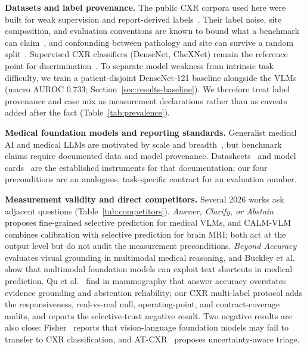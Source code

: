 \textbf{Datasets and label provenance.} The public CXR corpora used here were built for weak supervision and report-derived labels~\citep{wang2017chestxray8,bustos2020padchest,irvin2019chexpert,johnson2019mimic,chambon2024chexpertplus}. Their label noise, site composition, and evaluation conventions are known to bound what a benchmark can claim~\citep{rafferty2026limitations}, and confounding between pathology and site can survive a random split~\citep{zech2018confounding}. Supervised CXR classifiers (DenseNet, CheXNet) remain the reference point for discrimination~\citep{rajpurkar2017chexnet,huang2017densely}. To separate model weakness from intrinsic task difficulty, we train a patient-disjoint DenseNet-121 baseline alongside the VLMs (macro AUROC 0.733; Section~\ref{sec:results-baseline}). We therefore treat label provenance and case mix as measurement declarations rather than as caveats added after the fact (Table~\ref{tab:prevalence}).

\textbf{Medical foundation models and reporting standards.} Generalist medical AI and medical LLMs are motivated by scale and breadth~\citep{moor2023foundation,singhal2023medpalm,bommasani2021foundation}, but benchmark claims require documented data and model provenance. Datasheets~\citep{gebru2021datasheets} and model cards~\citep{mitchell2019model} are the established instruments for that documentation; our four preconditions are an analogous, task-specific contract for an evaluation number.

\textbf{Measurement validity and direct competitors.} Several 2026 works ask adjacent questions (Table~\ref{tab:competitors}). \emph{Answer, Clarify, or Abstain}~\citep{nguyen2026answer} proposes fine-grained selective prediction for medical VLMs, and CALM-VLM~\citep{dhinagar2026calm} combines calibration with selective prediction for brain MRI; both act at the output level but do not audit the measurement preconditions. \emph{Beyond Accuracy}~\citep{zafar2026beyond} evaluates visual grounding in multimodal medical reasoning, and Buckley et al.~\citep{buckley2026exploit} show that multimodal foundation models can exploit text shortcuts in medical prediction. Qu et al.~\citep{qu2026accuracy} find in mammography that answer accuracy overstates evidence grounding and abstention reliability; our CXR multi-label protocol adds the responsiveness, real-vs-real null, operating-point, and contract-coverage audits, and reports the selective-trust negative result. Two negative results are also close: Fisher~\citep{fisher2025negative} reports that vision-language foundation models may fail to transfer to CXR classification, and AT-CXR~\citep{li2025atcxr} proposes uncertainty-aware triage.

